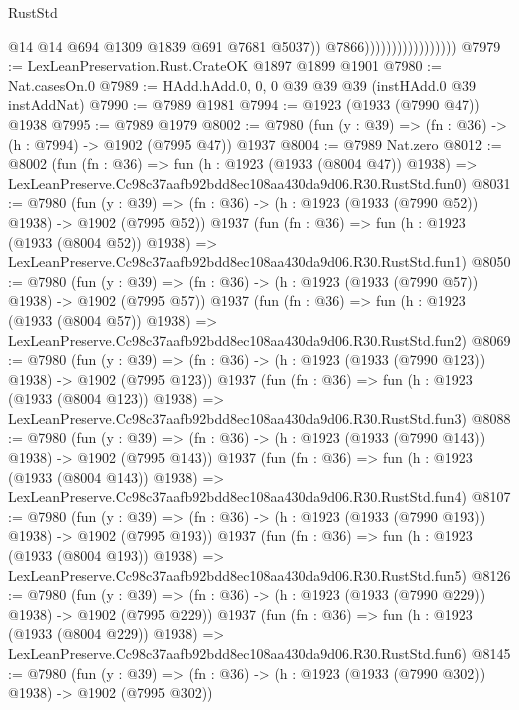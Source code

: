 \begin{lexlean}{RustStd}
\begin{coremodule}
                                          @14
                                          @14
                                          @694
                                          @1309
                                          @1839
                                          @691
                                          @7681
                                          @5037))
                                      @7866)))))))))))))))))
@7979 := LexLeanPreservation.Rust.CrateOK @1897 @1899 @1901
@7980 := Nat.casesOn.{0}
@7989 := HAdd.hAdd.{0, 0, 0} @39 @39 @39 (instHAdd.{0} @39 instAddNat)
@7990 := @7989 @1981
@7994 := @1923 (@1933 (@7990 @47)) @1938
@7995 := @7989 @1979
@8002 := @7980 (fun (y : @39) => (fn : @36) -> (h : @7994) -> @1902 (@7995 @47)) @1937
@8004 := @7989 Nat.zero
@8012 := @8002
    (fun (fn : @36) =>
    fun (h : @1923 (@1933 (@8004 @47)) @1938) =>
    LexLeanPreserve.Cc98c37aafb92bdd8ec108aa430da9d06.R30.RustStd.fun0)
@8031 := @7980
    (fun (y : @39) => (fn : @36) -> (h : @1923 (@1933 (@7990 @52)) @1938) -> @1902 (@7995 @52))
    @1937
    (fun (fn : @36) =>
    fun (h : @1923 (@1933 (@8004 @52)) @1938) =>
    LexLeanPreserve.Cc98c37aafb92bdd8ec108aa430da9d06.R30.RustStd.fun1)
@8050 := @7980
    (fun (y : @39) => (fn : @36) -> (h : @1923 (@1933 (@7990 @57)) @1938) -> @1902 (@7995 @57))
    @1937
    (fun (fn : @36) =>
    fun (h : @1923 (@1933 (@8004 @57)) @1938) =>
    LexLeanPreserve.Cc98c37aafb92bdd8ec108aa430da9d06.R30.RustStd.fun2)
@8069 := @7980
    (fun (y : @39) => (fn : @36) -> (h : @1923 (@1933 (@7990 @123)) @1938) -> @1902 (@7995 @123))
    @1937
    (fun (fn : @36) =>
    fun (h : @1923 (@1933 (@8004 @123)) @1938) =>
    LexLeanPreserve.Cc98c37aafb92bdd8ec108aa430da9d06.R30.RustStd.fun3)
@8088 := @7980
    (fun (y : @39) => (fn : @36) -> (h : @1923 (@1933 (@7990 @143)) @1938) -> @1902 (@7995 @143))
    @1937
    (fun (fn : @36) =>
    fun (h : @1923 (@1933 (@8004 @143)) @1938) =>
    LexLeanPreserve.Cc98c37aafb92bdd8ec108aa430da9d06.R30.RustStd.fun4)
@8107 := @7980
    (fun (y : @39) => (fn : @36) -> (h : @1923 (@1933 (@7990 @193)) @1938) -> @1902 (@7995 @193))
    @1937
    (fun (fn : @36) =>
    fun (h : @1923 (@1933 (@8004 @193)) @1938) =>
    LexLeanPreserve.Cc98c37aafb92bdd8ec108aa430da9d06.R30.RustStd.fun5)
@8126 := @7980
    (fun (y : @39) => (fn : @36) -> (h : @1923 (@1933 (@7990 @229)) @1938) -> @1902 (@7995 @229))
    @1937
    (fun (fn : @36) =>
    fun (h : @1923 (@1933 (@8004 @229)) @1938) =>
    LexLeanPreserve.Cc98c37aafb92bdd8ec108aa430da9d06.R30.RustStd.fun6)
@8145 := @7980
    (fun (y : @39) => (fn : @36) -> (h : @1923 (@1933 (@7990 @302)) @1938) -> @1902 (@7995 @302))

\end{coremodule}
\end{lexlean}
